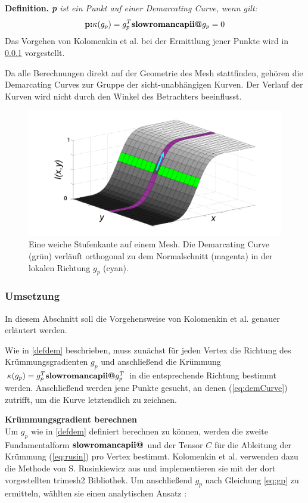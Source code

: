 \documentclass{paperStyle}
\makeatletter
\newcommand{\Rmnum}[1]{\textbf{\expandafter\@slowromancap\romannumeral #1@}}
\makeatother
\begin{document}
\textbf{Definition.} 
	\emph{\textbf{p} ist ein Punkt auf einer Demarcating Curve, wenn gilt:} \begin{equation}\label{eq:demCurve}
	\textbf{p:} \kappa(g_p) = g_p^T\Rmnum{2}g_p=0\end{equation}
 Das Vorgehen von Kolomenkin et al. bei der Ermittlung jener Punkte wird in \ref{implDem} vorgestellt. 
 
 Da alle Berechnungen direkt auf der Geometrie des Mesh stattfinden, gehören die Demarcating Curves zur Gruppe der sicht-unabhängigen Kurven. Der Verlauf der Kurven wird nicht durch den Winkel des Betrachters beeinflusst.
\begin{figure}
	\centering
	\includegraphics[width=0.9\linewidth]{demarcatingCurve.png}
	\caption{Eine weiche Stufenkante auf einem Mesh. Die Demarcating Curve (grün) verläuft orthogonal zu dem Normalschnitt (magenta) in der lokalen Richtung $g_p$ (cyan). \cite{Demarcating}}
	\label{fig:abcd}
\end{figure}
\subsubsection{Umsetzung}
\label{implDem}
 In diesem Abschnitt soll die Vorgehensweise von Kolomenkin et al. genauer erläutert werden.
 
 Wie in \ref{defdem} beschrieben, muss zunächst für jeden Vertex die Richtung des Krümmungsgradienten $g_p$ und anschließend die Krümmung  $\kappa(g_p) = g_p^T\Rmnum{2}g_p^T$ in die entsprechende Richtung bestimmt werden. Anschließend werden jene Punkte gesucht, an denen (\ref{eq:demCurve}) zutrifft, um die Kurve letztendlich zu zeichnen.
 
 \textbf{Krümmungsgradient berechnen}\\
 Um $g_p$ wie in \ref{defdem} definiert berechnen zu können, werden die zweite Fundamentalform $\Rmnum{2}$ und der Tensor $C$ für die Ableitung der Krümmung (\ref{eq:rusin}) pro Vertex bestimmt. Kolomenkin et al. verwenden dazu die Methode von S. Rusinkiewicz aus \cite{CurvDeriv2004} und implementieren sie mit der dort vorgestellten trimesh2 Bibliothek. Um anschließend $g_p$ nach Gleichung \ref{eq:gp} zu ermitteln, wählten sie einen analytischen Ansatz \cite{Demarcating}:
 
\end{document}
